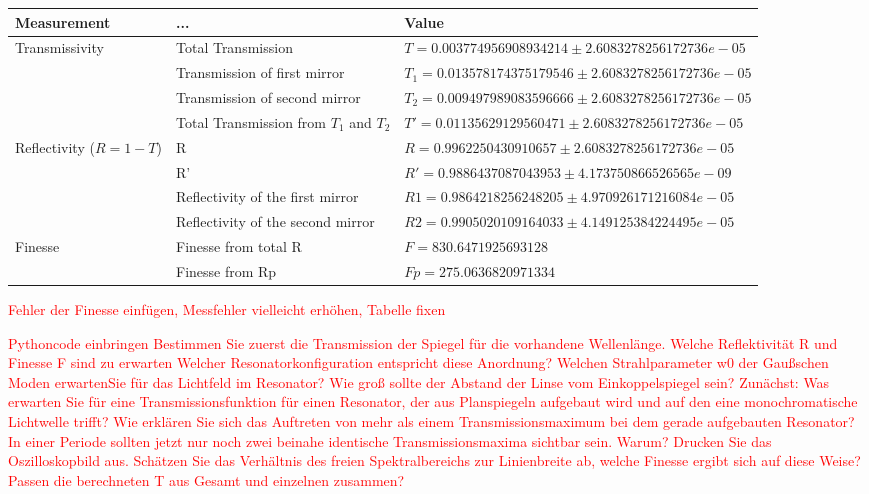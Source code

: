 \documentclass{article}
\begin{document}
\begin{table}[H]
\centering
\begin{tabular}{|p{2cm}|p{3cm}|p{6cm}|}
\hline
Measurement & ... & Value \\
\hline
\multirow{1}{*}{Transmissivity}
        &Total Transmission & $T= 0.003774956908934214 \pm 2.6083278256172736e-05$\\
        &Transmission of first mirror & $T_{1}= 0.013578174375179546 \pm 2.6083278256172736e-05$\\
        &Transmission of second mirror & $T_{2}= 0.009497989083596666 \pm 2.6083278256172736e-05$\\
        &Total Transmission from $T_{1}$ and $T_{2}$& $T' = 0.01135629129560471 \pm 2.6083278256172736e-05$\\
\hline
\multirow{1}{*}{Reflectivity ($R=1-T$)}
        & R  &$R=  0.9962250430910657 \pm 2.6083278256172736e-05$\\
        & R' &$R'=  0.9886437087043953 \pm 4.173750866526565e-09$\\
        & Reflectivity of the first mirror &$ R1=  0.9864218256248205 \pm 4.970926171216084e-05$\\
        & Reflectivity of the second mirror  &$R2=  0.9905020109164033 \pm 4.149125384224495e-05$\\
\hline
\multirow{1}{*}{Finesse}
        & Finesse from total R & $F= 830.6471925693128$\\
        & Finesse from Rp & $Fp = 275.0636820971334$ \\
\hline
\end{tabular}
\end{table}
 

\textcolor{red}{Fehler der Finesse einfügen, Messfehler vielleicht erhöhen, Tabelle fixen} %

\textcolor{red}{
Pythoncode einbringen
Bestimmen Sie zuerst die Transmission der Spiegel für die vorhandene Wellenlänge. Welche
Reflektivität R und Finesse F sind zu erwarten
Welcher Resonatorkonfiguration entspricht diese Anordnung? Welchen Strahlparameter w0 der Gaußschen Moden erwartenSie für das Lichtfeld im Resonator? Wie groß sollte der Abstand der Linse vom Einkoppelspiegel sein?
Zunächst: Was erwarten Sie für eine Transmissionsfunktion für einen Resonator, der aus Planspiegeln aufgebaut wird und auf den eine monochromatische Lichtwelle trifft? Wie erklären Sie sich das Auftreten von mehr als einem Transmissionsmaximum bei dem gerade aufgebauten Resonator? \\
In einer Periode sollten jetzt nur noch zwei beinahe identische Transmissionsmaxima sichtbar sein. Warum? Drucken Sie das Oszilloskopbild aus. Schätzen Sie das Verhältnis des freien Spektralbereichs zur Linienbreite ab, welche Finesse ergibt sich auf diese Weise? Passen die berechneten T aus Gesamt und einzelnen zusammen?}\\
\end{document}
